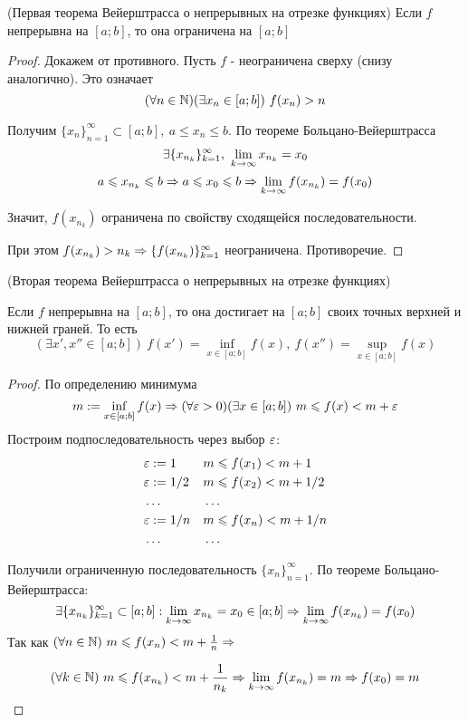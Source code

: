\begin{theorem} (Первая теорема Вейерштрасса о непрерывных на отрезке функциях)
	Если $f$ непрерывна на $[a; b]$, то она ограничена на $[a; b]$
\end{theorem}

\begin{proof}
	Докажем от противного. Пусть $f$ - неограничена сверху (снизу аналогично). Это означает
	\[
		(\forall n \in \N)(\exists x_n \in [a; b])\ f(x_n) > n
	\]
	
	Получим $\{x_n\}_{n = 1}^\infty \subset [a; b],\ a \le x_n \le b$. По теореме Больцано-Вейерштрасса
	\[
		\exists \{x_{n_k}\}_{k = 1}^\infty,\ \lim\limits_{k \to \infty} x_{n_k} = x_0
	\]
	\[
		a \leqslant x_{n_k} \leqslant b \Rightarrow a \leqslant x_0 \leqslant b
		\Rightarrow \lim\limits_{k \to \infty} f(x_{n_k}) = f(x_0)
	\]

	Значит, $f(x_{n_k})$ ограничена по свойству сходящейся последовательности.
	
	При этом $f(x_{n_k}) > n_k \Rightarrow \{f(x_{n_k})\}_{k = 1}^{\infty}$ неограничена.
	Противоречие.
\end{proof}

\begin{theorem} (Вторая теорема Вейерштрасса о непрерывных на отрезке функциях)

	Если $f$ непрерывна на $[a; b]$, то она достигает на $[a; b]$
	своих точных верхней и нижней граней. То есть
	\[
		(\exists x', x'' \in [a; b])\ f(x') = \inf\limits_{x \in [a; b]} f(x),\ f(x'') = \sup\limits_{x \in [a; b]} f(x)
	\]
\end{theorem}

\begin{proof}
	По определению минимума
	\[
		m := \inf\limits_{x \in [a; b]} f(x) \Rightarrow (\forall \varepsilon > 0)
		(\exists x \in [a; b])\ m \leqslant f(x) < m + \varepsilon
	\]
	Построим подпоследовательность через выбор $\varepsilon$:
	\begin{align*}
		&\varepsilon := 1 & &m \leqslant f(x_1) < m + 1
		\\
		&\varepsilon := 1/2 & &m \leqslant f(x_2) < m + 1/2
		\\
		&\dots & &\dots
		\\
		&\varepsilon := 1/n & &m \leqslant f(x_n) < m + 1/n
		\\
		&\dots & &\dots
	\end{align*}

	Получили ограниченную последовательность $\{x_n\}_{n = 1}^\infty$.
	По теореме Больцано-Вейерштрасса:
	\[
		\exists \{x_{n_k}\}_{k = 1}^\infty \subset [a; b] :
		\lim\limits_{k \to \infty} x_{n_k} = x_0 \in [a; b] \Rightarrow \lim\limits_{k \to \infty}
		f(x_{n_k}) = f(x_0)
	\]
	Так как	$(\forall n \in \mathbb{N})\ m \leqslant f(x_n) < m + \frac{1}{n} \Rightarrow$

	\[
	(\forall k \in \mathbb{N})\ m \leqslant f(x_{n_k}) < m + \frac{1}{n_k}
	\Rightarrow \lim\limits_{k \to \infty} f(x_{n_k}) = m \Rightarrow f(x_0) = m
	\]
\end{proof}

